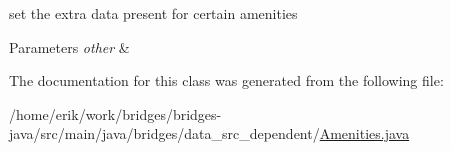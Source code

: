set the extra data present for certain amenities 
\begin{DoxyParams}{Parameters}
{\em other} & \\
\hline
\end{DoxyParams}


The documentation for this class was generated from the following file\+:\begin{DoxyCompactItemize}
\item 
/home/erik/work/bridges/bridges-\/java/src/main/java/bridges/data\+\_\+src\+\_\+dependent/\hyperlink{_amenities_8java}{Amenities.\+java}\end{DoxyCompactItemize}
